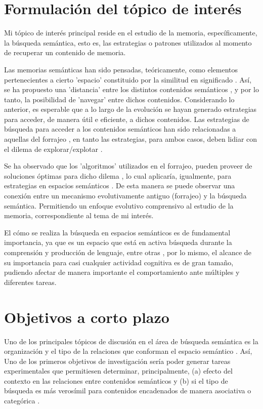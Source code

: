\documentclass[11pt]{article}
\begin{document}
\section*{Formulación del tópico de interés}
\label{sec:org43d9436}
Mi tópico de interés principal reside en el estudio de la memoria,
específicamente, la búsqueda semántica, esto es, las estrategias o patrones
utilizados al momento de recuperar un contenido de memoria.

 Las memorias semánticas han sido pensadas, teóricamente, como elementos
pertenecientes a cierto 'espacio' constituido por la similitud en significado
\citep{lundProducingHighdimensionalSemantic1996}. Así, se ha propuesto una
'distancia' entre los distintos contenidos semánticos
\citep{montezRoleSemanticClustering2015}, y por lo tanto, la posibilidad de
'navegar' entre dichos contenidos. Considerando lo anterior, es esperable que a
lo largo de la evolución se hayan generado estrategias para acceder, de manera
útil e eficiente, a dichos contenidos. Las estrategias de búsqueda para acceder
a los contenidos semánticos han sido relacionadas a aquellas del forrajeo
\citep{ForagingSemanticFields,hillsAnimalForagingEvolution2006,hillsOptimalForagingSemantic2012},
en tanto las estrategias, para ambos casos, deben lidiar con el dilema de
explorar/explotar \citep{berger-talExplorationExploitationDilemmaMultidisciplinary2014}.

Se ha observado que los 'algoritmos' utilizados en el forrajeo, pueden proveer
de soluciones óptimas para dicho dilema
\citep{bartumeusAnimalSearchStrategies2005a}, lo cual aplicaría, igualmente, para
estrategias en espacios semánticos \citep{montezRoleSemanticClustering2015}. De
esta manera se puede observar una conexión entre un mecanismo evolutivamente
antiguo (forrajeo) y la búsqueda semántica. Permitiendo un enfoque evolutivo
comprensivo al estudio de la memoria, correspondiente al tema de mi interés.

El cómo se realiza la búsqueda en espacios semánticos es de
fundamental importancia, ya que es un espacio que está en activa
búsqueda durante la comprensión y producción de lenguaje, entre otras
\citep{montezRoleSemanticClustering2015}, por lo mismo, el alcance de su
importancia para casi cualquier actividad cognitiva es de gran tamaño,
pudiendo afectar de manera importante el comportamiento ante múltiples y
diferentes tareas.
\section*{Objetivos a corto plazo}
\label{sec:org3d0fa85}
Uno de los principales tópicos de discusión en el área de búsqueda
semántica es la organización y el tipo de la relaciones que conforman
el espacio semántico \citep{lundProducingHighdimensionalSemantic1996}. Así, Uno de los primeros
objetivos de investigación sería poder generar tareas
experimentales que permitiesen determinar, principalmente, (a) efecto
del contexto en las relaciones entre contenidos semánticos
\citep{schillerMemorySpaceUnderstanding2015} y (b) si el tipo de búsqueda es más
verosímil para contenidos encadenados de manera asociativa o categórica
\citep{hillsOptimalForagingSemantic2012}. 
\end{document}
